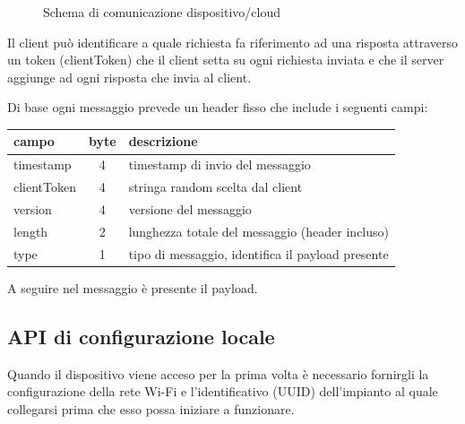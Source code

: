 \documentclass[12pt,a4paper,twoside,titlepage]{book}
\begin{document}
\begin{figure}[ht]
    \centering
    \caption{Schema di comunicazione dispositivo/cloud}
    \label{fig:comunicazione_cloud}
\end{figure}

Il client può identificare a quale richiesta fa riferimento ad una risposta attraverso un
token (clientToken) che il client setta su ogni richiesta inviata e che il server aggiunge
ad ogni risposta che invia al client.

Di base ogni messaggio prevede un header fisso che include i seguenti campi:

\begin{center}
\begin{tabular}{| l | c | l |}
    \hline
    \textbf{campo} & \textbf{byte} & \textbf{descrizione} \\
    \hline
    timestamp & 4 & timestamp di invio del messaggio \\
    \hline
    clientToken & 4 & stringa random scelta dal client \\
    \hline
    version & 4 & versione del messaggio \\
    \hline
    length & 2 & lunghezza totale del messaggio (header incluso) \\
    \hline
    type & 1 & tipo di messaggio, identifica il payload presente \\
    \hline
\end{tabular}
\end{center}

A seguire nel messaggio è presente il payload.

\subsection{API di configurazione locale}

Quando il dispositivo viene acceso per la prima volta è necessario fornirgli la
configurazione della rete Wi-Fi e l'identificativo (UUID) dell'impianto al quale
collegarsi prima che esso possa iniziare a funzionare.
\end{document}

